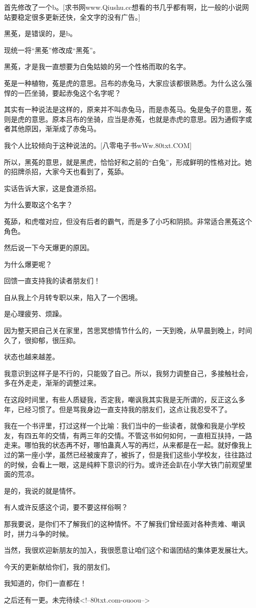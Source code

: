 \begin{this_body}
首先修改了一个b。[求书网www.Qiushu.cc想看的书几乎都有啊，比一般的小说网站要稳定很多更新还快，全文字的没有广告。]

黑莬，是错误的，是b。

现统一将“黑莬”修改成“黑菟”。

黑菟，才是我一直想要为白兔姑娘的另一个性格而取的名字。

莬是一种植物，菟是虎的意思。吕布的赤兔马，大家应该都很熟悉。为什么这么强悍的一匹坐骑，要起赤兔这个名字呢？

其实有一种说法是这样的，原来并不叫赤兔马，而是赤菟马。兔是兔子的意思，菟则是虎的意思。原本吕布的坐骑，应当是赤菟，也就是赤虎的意思。因为通假字或者其他原因，渐渐成了赤兔马。

我个人比较倾向于这种说法的。[八零电子书wWw.80txt.COM]

所以，黑菟的意思，就是黑虎，恰恰好和之前的“白兔”，形成鲜明的性格对比。她的招牌杀招，大家今天也看到了，菟舔。

实话告诉大家，这是食道杀招。

为什么要取这个名字？

菟舔，和虎噬对应，但没有后者的霸气，而是多了小巧和阴损。非常适合黑菟这个角色。

然后说一下今天爆更的原因。

为什么爆更呢？

回馈一直支持我的读者朋友们！

自从我上个月转专职以来，陷入了一个困境。

是心理疲劳、烦躁。

因为整天把自己关在家里，苦思冥想情节什么的，一天到晚，从早晨到晚上，时间久了，很抑郁，很压抑。

状态也越来越差。

我意识到这样子是不行的，只能毁了自己。所以，我努力调整自己，多接触社会，多在外走走，渐渐的调整过来。

在这段时间里，有些人质疑我，否定我，嘲讽我其实我是无所谓的，反正这么多年，已经习惯了。但是骂我身边一直支持我的朋友们，这点让我忍受不了。

我在一个书评里，打过这样一个比喻：我们当中的一些读者，就像和我是小学校友，有四五年的交情，有两三年的交情。不管这书如何如何，一直相互扶持，一路走来。哪怕我的状态再不好，哪怕蛊真人写的再烂，从来都是在一起。就好像我上过的第一座小学，虽然已经被废弃了，被拆了，但是我们这些小学校友，往往路过的时候，会看上一眼，这是纯粹下意识的行为。或许还会趴在小学大铁门前观望里面的荒凉。

是的，我说的就是情怀。

有人或许反感这个词，要不要这样俗啊？

那我要说，是你们不了解我们的这种情怀。不了解我们曾经面对各种责难、嘲讽时，拼力斗争的时候。

当然，我很欢迎新朋友的加入，我很愿意让咱们这个和谐团结的集体更发展壮大。

今天的更新献给你们，我的朋友们。

我知道的，你们一直都在！

之后还有一更。未完待续<!--80txt.com-ouoou-->

\end{this_body}

